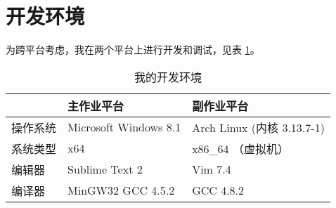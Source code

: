 \section{开发环境}

为跨平台考虑，我在两个平台上进行开发和调试，见表 \ref{development}。

\begin{table}[htbp]
\begin{center}
\caption{\label{development}我的开发环境}
\begin{tabular}{l|ll}
 & 主作业平台 & 副作业平台 \\\hline
操作系统 & Microsoft Windows 8.1 & Arch Linux (内核 3.13.7-1) \\
系统类型 & x64 & x86\_64 （虚拟机）\\
编辑器 & Sublime Text 2 & Vim 7.4 \\
编译器 & MinGW32 GCC 4.5.2 & GCC 4.8.2 \\
\end{tabular}
\end{center}
\end{table}
